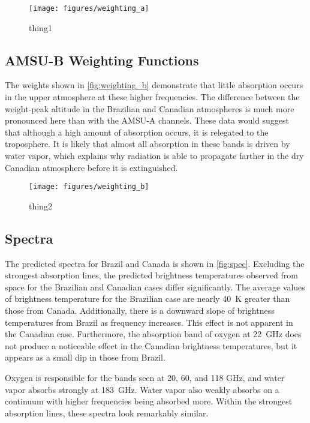 \documentclass[twocol]{ametsoc}
\begin{document}
\begin{figure}
	\centering
	\texttt{[image: figures/weighting\_a]}
	\caption{thing1}
	\label{fig:weighting_a}
\end{figure}

\subsection{AMSU-B Weighting Functions}

The weights shown in \autoref{fig:weighting_b} demonstrate that little absorption occurs in the upper atmosphere at these higher frequencies.
The difference between the weight-peak altitude in the Brazilian and Canadian atmospheres is much more pronounced here than with the AMSU-A channels.
These data would suggest that although a high amount of absorption occurs, it is relegated to the troposphere.
It is likely that almost all absorption in these bands is driven by water vapor, which explains why radiation is able to propagate farther in the dry Canadian atmosphere before it is extinguished.

\begin{figure}
	\centering
	\texttt{[image: figures/weighting\_b]}
	\caption{thing2}
	\label{fig:weighting_b}
\end{figure}

\subsection{Spectra}

The predicted spectra for Brazil and Canada is shown in \autoref{fig:spec}.
Excluding the strongest absorption lines, the predicted brightness temperatures observed from space for the Brazilian and Canadian cases differ significantly.
The average values of brightness temperature for the Brazilian case are nearly 40~K greater than those from Canada.
Additionally, there is a downward slope of brightness temperatures from Brazil as frequency increases.
This effect is not apparent in the Canadian case.
Furthermore, the absorption band of oxygen at 22~GHz does not produce a noticeable effect in the Canadian brightness temperatures, but it appears as a small dip in those from Brazil.

Oxygen is responsible for the bands seen at 20, 60, and 118 GHz, and water vapor absorbs strongly at 183~GHz. Water vapor also weakly absorbs on a continuum with higher frequencies being absorbed more.
Within the strongest absorption lines, these spectra look remarkably similar.
\end{document}
